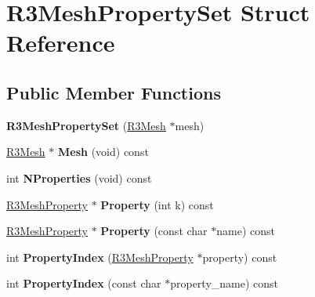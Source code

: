 \hypertarget{struct_r3_mesh_property_set}{}\section{R3\+Mesh\+Property\+Set Struct Reference}
\label{struct_r3_mesh_property_set}
\subsection*{Public Member Functions}
\begin{DoxyCompactItemize}
\item 
{\bfseries R3\+Mesh\+Property\+Set} (\hyperlink{class_r3_mesh}{R3\+Mesh} $\ast$mesh)\hypertarget{struct_r3_mesh_property_set_ae13664743b8f023e8a7601f04b528b96}{}\label{struct_r3_mesh_property_set_ae13664743b8f023e8a7601f04b528b96}

\item 
\hyperlink{class_r3_mesh}{R3\+Mesh} $\ast$ {\bfseries Mesh} (void) const \hypertarget{struct_r3_mesh_property_set_a1204a1ed3e98cb7801afbcbbfaf49b35}{}\label{struct_r3_mesh_property_set_a1204a1ed3e98cb7801afbcbbfaf49b35}

\item 
int {\bfseries N\+Properties} (void) const \hypertarget{struct_r3_mesh_property_set_a8121904ec59144bc0ad92fa7c885e659}{}\label{struct_r3_mesh_property_set_a8121904ec59144bc0ad92fa7c885e659}

\item 
\hyperlink{struct_r3_mesh_property}{R3\+Mesh\+Property} $\ast$ {\bfseries Property} (int k) const \hypertarget{struct_r3_mesh_property_set_a47fd23bdeb5e8cc7a0005877bdf2463e}{}\label{struct_r3_mesh_property_set_a47fd23bdeb5e8cc7a0005877bdf2463e}

\item 
\hyperlink{struct_r3_mesh_property}{R3\+Mesh\+Property} $\ast$ {\bfseries Property} (const char $\ast$name) const \hypertarget{struct_r3_mesh_property_set_a0a7ecd1faa7c7e62eda9fcb441c63696}{}\label{struct_r3_mesh_property_set_a0a7ecd1faa7c7e62eda9fcb441c63696}

\item 
int {\bfseries Property\+Index} (\hyperlink{struct_r3_mesh_property}{R3\+Mesh\+Property} $\ast$property) const \hypertarget{struct_r3_mesh_property_set_aec0fd03707de5028090e410d5176d893}{}\label{struct_r3_mesh_property_set_aec0fd03707de5028090e410d5176d893}

\item 
int {\bfseries Property\+Index} (const char $\ast$property\+\_\+name) const \hypertarget{struct_r3_mesh_property_set_a63429bf2c02ef660190950c66ca3b3a0}{}\label{struct_r3_mesh_property_set_a63429bf2c02ef660190950c66ca3b3a0}


\end{DoxyCompactItemize}
